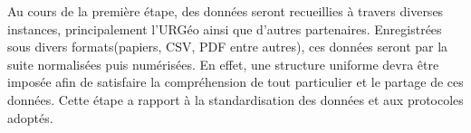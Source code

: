 \par
Au cours de la première étape, des données seront recueillies à 
travers diverses instances, principalement l'URGéo ainsi que d'autres partenaires. 
Enregistrées sous divers formats(papiers, CSV, PDF entre autres), 
ces données seront par la suite normalisées puis numérisées. En 
effet, une structure uniforme devra être imposée afin de satisfaire la 
compréhension de tout particulier et le partage de ces données.
Cette étape a rapport à la standardisation des données et aux protocoles adoptés.